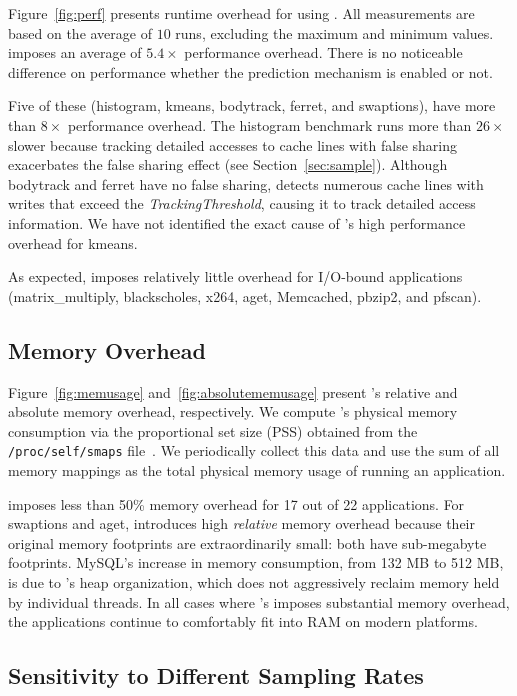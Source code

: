 Figure~\ref{fig:perf} presents runtime overhead for using \Predator{}. All 
measurements are based on the average of $10$ runs, excluding the maximum and minimum values. \Predator{} imposes an average of $5.4\times$ performance overhead. There is no noticeable difference on performance whether the prediction mechanism is enabled or not. 
 
Five of these (histogram, kmeans, bodytrack, ferret, and swaptions), have more than $8\times$ performance overhead. The histogram benchmark runs more than $26\times$ slower because tracking detailed accesses to cache lines with false sharing exacerbates the false sharing effect (see Section~\ref{sec:sample}). Although bodytrack and ferret have no false sharing, \Predator{} detects numerous cache lines with writes that exceed the {\it TrackingThreshold}, causing it to track detailed access information. We have not identified the exact cause of \Predator{}'s high performance overhead for kmeans.
   
As expected, \Predator{} imposes relatively little overhead for I/O-bound applications (matrix\_multiply, blackscholes, x264, aget, Memcached, pbzip2, and pfscan).

\subsection{Memory Overhead}
\label{sec:memoverhead}

Figure~\ref{fig:memusage} and~\ref{fig:absolutememusage} present \Predator{}'s relative and absolute memory overhead, respectively. We compute \Predator{}'s physical memory consumption via the proportional set size (PSS) obtained from the \texttt{/proc/self/smaps} file~\cite{memusage}. We periodically collect this data and use the sum of all memory mappings as the total physical memory usage of running an application.

\Predator{} imposes less than 50\% memory overhead for 17 out of 22 applications.  For swaptions and aget, \Predator{} introduces high \emph{relative} memory overhead because their original memory footprints are extraordinarily small: both have sub-megabyte footprints. MySQL's increase in memory consumption, from 132 MB to 512 MB, is due to \Predator{}'s heap organization, which does not aggressively reclaim memory held by individual threads. In all cases where \Predator{}'s imposes substantial memory overhead, the applications continue to comfortably fit into RAM on modern platforms.

\subsection{Sensitivity to Different Sampling Rates}
\label{sec:sensitivity}

